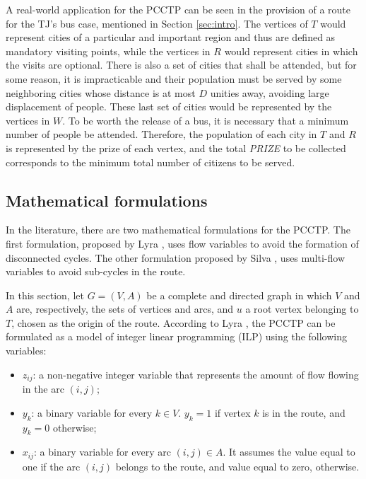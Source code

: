 \documentclass{ro}
\begin{document}
A real-world application for the PCCTP can be seen in the provision of a route for the TJ's bus case, mentioned in Section \ref{sec:intro}. The vertices of $T$ would represent cities of a particular and important region  and thus are defined as mandatory visiting points, while the vertices in $R$ would represent cities in which the visits are optional. There is also a set of cities that shall be attended, but for some reason, it is impracticable and their population must be served by some neighboring cities whose distance is at most $D$ unities away, avoiding large displacement of people. These last set of cities would be represented by the vertices in $W$. To be worth the release of a bus, it is necessary that a minimum number of people be attended. Therefore, the population of each city in $T$   and $R$ is represented by the prize of each vertex, and the total \textit{PRIZE} to be collected corresponds to the minimum total number of citizens to be served. 

\subsection{Mathematical formulations}

In the literature, there are two mathematical formulations for the PCCTP. The first formulation, proposed by Lyra \cite{lyra2004problema}, uses flow variables to avoid the formation of disconnected cycles. The other formulation proposed by Silva \cite{silva2009problema}, uses multi-flow variables to avoid sub-cycles in the route.



In this section, let $G=(V,A)$ be a complete and directed graph in which $V$ and $A$ are, respectively, the sets of vertices and arcs, and $u$ a root vertex belonging to $T$, chosen as the origin of the route. According to Lyra \cite{lyra2004problema}, the PCCTP can be formulated as a model of integer linear programming (ILP) using the following variables:

\begin{itemize}
\item $z_{ij}$: a non-negative integer variable that represents the amount of flow flowing in the arc $(i,j)$;
\item $y_k$: a binary variable for every $k \in V$. $y_k=1$ if vertex $k$ is in the route, and $y_k=0$ otherwise;
\item $x_{ij}$: a binary variable for every arc $(i,j) \in A$. It assumes the value equal to one if the arc $(i,j)$ belongs to the route, and value equal to zero, otherwise.
\end{itemize}
\end{document}
